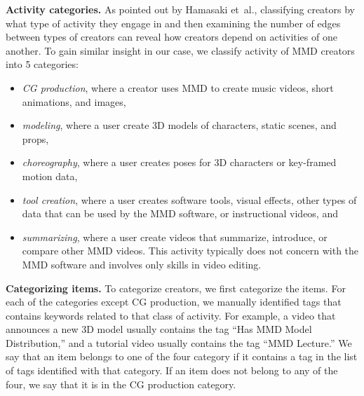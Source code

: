 \documentclass[10pt, a4paper]{article}
\newcommand{\etal}{{et~al.}}
\begin{document}
{\bf Activity categories.} As pointed out by Hamasaki \etal, classifying creators by what type of activity they engage in and then examining the number of edges between types of creators can reveal how creators depend on activities of one another. To gain similar insight in our case, we classify activity of MMD creators into 5 categories:
\begin{itemize}
	\item \emph{CG production}, where a creator uses MMD to create music videos, short animations, and images,
	\item \emph{modeling}, where a user create 3D models of characters, static scenes, and props,
	\item \emph{choreography}, where a user creates poses for 3D characters or key-framed motion data,
	\item \emph{tool creation}, where a user creates software tools, visual effects, other types of data that can be used by the MMD software, or instructional videos, and
	\item \emph{summarizing}, where a user create videos that summarize, introduce, or compare other MMD videos. This activity typically does not concern with the MMD software and involves only skills in video editing. 
\end{itemize}

{\bf Categorizing items.} To categorize creators, we first categorize the items. For each of the categories except CG production, we manually identified tags that contains keywords related to that class of activity. For example, a video that announces a new 3D model usually contains the tag ``Has MMD Model Distribution,'' and a tutorial video usually contains the tag ``MMD Lecture.'' We say that an item belongs to one of the four category if it contains a tag in the list of tags identified with that category. If an item does not belong to any of the four, we say that it is in the CG production category.
\end{document}
